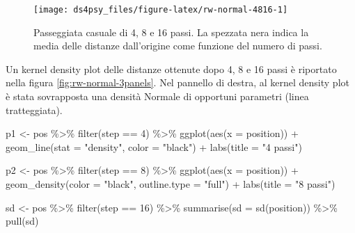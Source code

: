 \documentclass[
  11pt,
]{krantz}
\makeatletter
\newenvironment{Shaded}{\begin{snugshade}}{\end{snugshade}}
\newcommand{\AttributeTok}[1]{\textcolor[rgb]{0.61,0.61,0.61}{#1}}
\newcommand{\DecValTok}[1]{\textcolor[rgb]{0.06,0.06,0.06}{#1}}
\newcommand{\FunctionTok}[1]{\textcolor[rgb]{0,0,0}{#1}}
\newcommand{\NormalTok}[1]{#1}
\newcommand{\OtherTok}[1]{\textcolor[rgb]{0.37,0.37,0.37}{#1}}
\newcommand{\SpecialCharTok}[1]{\textcolor[rgb]{0,0,0}{#1}}
\newcommand{\StringTok}[1]{\textcolor[rgb]{0.5,0.5,0.5}{#1}}
\newenvironment{kframe}{%
\medskip{}
\setlength{\fboxsep}{.8em}
 \def\at@end@of@kframe{}%
 \ifinner\ifhmode%
  \def\at@end@of@kframe{\end{minipage}}%
  \begin{minipage}{\columnwidth}%
 \fi\fi%
 \def\FrameCommand##1{\hskip\@totalleftmargin \hskip-\fboxsep
 \colorbox{shadecolor}{##1}\hskip-\fboxsep
     \hskip-\linewidth \hskip-\@totalleftmargin \hskip\columnwidth}%
 \MakeFramed {\advance\hsize-\width
   \@totalleftmargin\z@ \linewidth\hsize
   \@setminipage}}%
 {\par\unskip\endMakeFramed%
 \at@end@of@kframe}
\renewenvironment{Shaded}{\begin{kframe}}{\end{kframe}}
\theoremstyle{definition}
\theoremstyle{definition}
\theoremstyle{definition}
\theoremstyle{definition}
\theoremstyle{remark}
\makeatother
\begin{document}
\begin{figure}[h]

{\centering \texttt{[image: ds4psy\_files/figure-latex/rw-normal-4816-1]} 

}

\caption{Passeggiata casuale di 4, 8 e 16 passi. La spezzata nera indica la media delle distanze dall'origine come funzione del numero di passi.}\label{fig:rw-normal-4816}
\end{figure}

Un kernel density plot delle distanze ottenute dopo 4, 8 e 16 passi è riportato nella figura \ref{fig:rw-normal-3panels}. Nel pannello di destra, al kernel density plot è stata sovrapposta una densità Normale di opportuni parametri (linea tratteggiata).

\begin{Shaded}
\begin{Highlighting}[]
\NormalTok{p1 }\OtherTok{\textless{}{-}}
\NormalTok{  pos }\SpecialCharTok{\%\textgreater{}\%}
  \FunctionTok{filter}\NormalTok{(step }\SpecialCharTok{==} \DecValTok{4}\NormalTok{) }\SpecialCharTok{\%\textgreater{}\%}
  \FunctionTok{ggplot}\NormalTok{(}\FunctionTok{aes}\NormalTok{(}\AttributeTok{x =}\NormalTok{ position)) }\SpecialCharTok{+}
  \FunctionTok{geom\_line}\NormalTok{(}\AttributeTok{stat =} \StringTok{"density"}\NormalTok{, }\AttributeTok{color =} \StringTok{"black"}\NormalTok{) }\SpecialCharTok{+}
  \FunctionTok{labs}\NormalTok{(}\AttributeTok{title =} \StringTok{"4 passi"}\NormalTok{)}

\NormalTok{p2 }\OtherTok{\textless{}{-}}
\NormalTok{  pos }\SpecialCharTok{\%\textgreater{}\%}
  \FunctionTok{filter}\NormalTok{(step }\SpecialCharTok{==} \DecValTok{8}\NormalTok{) }\SpecialCharTok{\%\textgreater{}\%}
  \FunctionTok{ggplot}\NormalTok{(}\FunctionTok{aes}\NormalTok{(}\AttributeTok{x =}\NormalTok{ position)) }\SpecialCharTok{+}
  \FunctionTok{geom\_density}\NormalTok{(}\AttributeTok{color =} \StringTok{"black"}\NormalTok{, }\AttributeTok{outline.type =} \StringTok{"full"}\NormalTok{) }\SpecialCharTok{+}
  \FunctionTok{labs}\NormalTok{(}\AttributeTok{title =} \StringTok{"8 passi"}\NormalTok{)}

\NormalTok{sd }\OtherTok{\textless{}{-}}
\NormalTok{  pos }\SpecialCharTok{\%\textgreater{}\%}
  \FunctionTok{filter}\NormalTok{(step }\SpecialCharTok{==} \DecValTok{16}\NormalTok{) }\SpecialCharTok{\%\textgreater{}\%}
  \FunctionTok{summarise}\NormalTok{(}\AttributeTok{sd =} \FunctionTok{sd}\NormalTok{(position)) }\SpecialCharTok{\%\textgreater{}\%}
  \FunctionTok{pull}\NormalTok{(sd)}


\end{Highlighting}
\end{Shaded}
\end{document}

